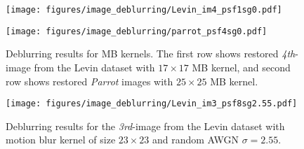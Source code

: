 \documentclass[10pt,journal,compsoc]{IEEEtran}
\begin{document}
\begin{figure}[t!]
\begin{centering}

\texttt{[image: figures/image\_deblurring/Levin\_im4\_psf1sg0.pdf]}

\texttt{[image: figures/image\_deblurring/parrot\_psf4sg0.pdf]}


\end{centering}
\caption{Deblurring results for MB kernels.
The first row shows restored \textit{4th}-image from the Levin dataset with $17 \times 17$ MB kernel, and second row shows restored \textit{Parrot} images with $25 \times 25$ MB kernel.}
\label{fig:image_deblurM1}
\end{figure}






\begin{figure*}[t!]
\begin{centering}

\texttt{[image: figures/image\_deblurring/Levin\_im3\_psf8sg2.55.pdf]}

\end{centering}
\caption{Deblurring results for the \textit{3rd}-image from the Levin dataset with motion blur kernel of size $23 \times 23$ and random AWGN $\sigma=2.55$.}
\label{fig:image_deblurM2}
\end{figure*}
\end{document}
